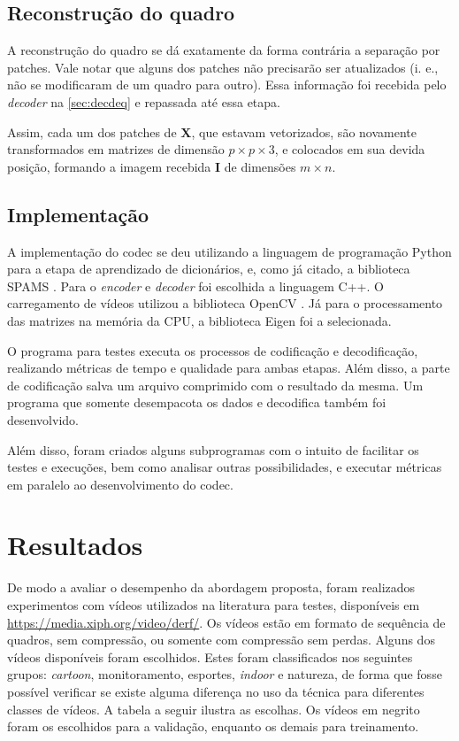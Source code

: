 \documentclass[cic,tc]{iiufrgs}
\newcommand{\mat}[1]{\bm{#1}}
\begin{document}
\section{Reconstrução do quadro}
A reconstrução do quadro se dá exatamente da forma contrária a separação por patches.
Vale notar que alguns dos patches não precisarão ser atualizados
(i. e., não se modificaram de um quadro para outro).
Essa informação foi recebida pelo \textit{decoder} na \autoref{sec:decdeq} e repassada
até essa etapa.

Assim, cada um dos patches de $\mat{X}$, que estavam vetorizados, são novamente transformados
em matrizes de dimensão $p \times p \times 3$, e colocados em sua devida posição, formando
a imagem recebida $\mat{I}$ de dimensões $m \times n$.

\section{Implementação}
A implementação do codec se deu utilizando a linguagem de programação Python para a etapa 
de aprendizado de dicionários, e, como já citado, a biblioteca SPAMS \cite{SPAMS}.
Para o \emph{encoder} e \emph{decoder} foi escolhida a linguagem C++. 
O carregamento de vídeos utilizou a biblioteca OpenCV \cite{OpenCV}.
Já para o processamento das matrizes na memória da CPU, a biblioteca 
Eigen \cite{Eigen} foi a selecionada.

O programa para testes executa os processos de codificação e decodificação, realizando 
métricas de tempo e qualidade para ambas etapas.
Além disso, a parte de codificação salva um arquivo comprimido com o resultado da mesma.
Um programa que somente desempacota os dados e decodifica também foi desenvolvido.

Além disso, foram criados alguns subprogramas com o intuito de facilitar os testes e 
execuções, bem como analisar outras possibilidades, e executar métricas em paralelo ao 
desenvolvimento do codec.

\chapter{Resultados}
\label{sec:results}
De modo a avaliar o desempenho da abordagem proposta, foram realizados experimentos 
com vídeos utilizados na literatura para testes,
disponíveis em \url{https://media.xiph.org/video/derf/}.
Os vídeos estão em formato de sequência de quadros, sem compressão, ou somente com 
compressão sem perdas.
Alguns dos vídeos disponíveis foram escolhidos.
Estes foram classificados nos seguintes grupos: \textit{cartoon}, 
monitoramento, esportes, \textit{indoor} e natureza, de forma que fosse possível 
verificar se existe alguma diferença no uso da técnica para diferentes classes de vídeos.
A tabela a seguir ilustra as escolhas.
Os vídeos em negrito foram os escolhidos para a validação, enquanto os demais para treinamento.
\end{document}
